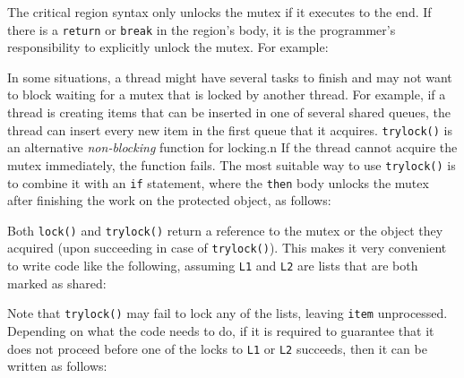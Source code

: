 The critical region syntax only unlocks the mutex if it executes to the end. If
there is a \texttt{return} or \texttt{break} in the region's body, it is the
programmer's responsibility to explicitly unlock the mutex.  For example:


In some situations, a thread might have several tasks to finish and may not want
to block waiting for a mutex that is locked by another thread. For example, if a
thread is creating items that can be inserted in one of several shared queues,
the thread can insert every new item in the first queue that it
acquires. \texttt{trylock()} is an alternative \emph{non-blocking} function for
locking.n If the thread cannot acquire the mutex immediately, the function
fails. The most suitable way to use \texttt{trylock()} is to combine it with an
\texttt{if} statement, where the \texttt{then} body unlocks the mutex after
finishing the work on the protected object, as follows:


Both \texttt{lock()} and \texttt{trylock()} return a reference to the mutex or
the object they acquired (upon succeeding in case of \texttt{trylock()}). This
makes it very convenient to write code like the following, assuming \texttt{L1}
and \texttt{L2} are lists that are both marked as shared:


Note that \texttt{trylock()} may fail to lock any of the lists, leaving
\texttt{item} unprocessed. Depending on what the code needs to do, if it is
required to guarantee that it does not proceed before one of the locks to
\texttt{L1} or \texttt{L2} succeeds, then it can be written as follows:


